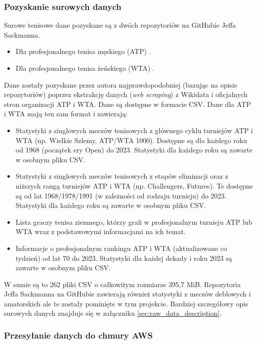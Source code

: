 \documentclass[12pt, a4paper]{article}
\begin{document}
\subsubsection{Pozyskanie surowych danych}
Surowe tenisowe dane pozyskane są z dwóch repozytoriów na GitHubie Jeffa Sackmanna.
\begin{itemize}
    \item Dla profesjonalnego tenisa męskiego (ATP) \cite{tennis_atp}.
    \item Dla profesjonalnego tenisa żeńskiego (WTA) \cite{tennis_wta}.
\end{itemize}
Dane zostały pozyskane przez autora najprawdopodobniej (bazując na opisie repozytoriów) poprzez ekstrakcję danych (\textit{web scraping}) z Wikidata i oficjalnych stron organizacji ATP i WTA. Dane są dostępne w formacie CSV. Dane dla ATP i WTA mają ten sam format i zawierają:
\begin{itemize}
    \item Statystyki z singlowych meczów tenisowych z głównego cyklu turniejów ATP i WTA (np. Wielkie Szlemy, ATP/WTA 1000). Dostępne są dla każdego roku od 1968 (początek ery Open) do 2023. Statystyki dla każdego roku są zawarte w osobnym pliku CSV.
    \item Statystyki z singlowych meczów tenisowych z etapów eliminacji oraz z niższych rangą turniejów ATP i WTA (np. Challengers, Futures). Te dostępne są od lat 1968/1978/1991 (w zależności od rodzaju turnieju) do 2023. Statystyki dla każdego roku są zawarte w osobnym pliku CSV.
    \item Lista graczy tenisa ziemnego, którzy grali w profesjonalnym turnieju ATP lub WTA wraz z podstawowymi informacjami na ich temat.
    \item Informacje o profesjonalnym rankingu ATP i WTA (aktualizowane co tydzień) od lat 70 do 2023. Statystyki dla każdej dekady i roku 2023 są zawarte w osobnym pliku CSV.
\end{itemize}
W sumie są to 262 pliki CSV o całkowitym rozmiarze 395,7 MiB. Repozytoria Jeffa Sackmanna na GitHubie zawierają również statystyki z meczów deblowych i amatorskich ale te zostały pominięte w tym projekcie. Bardziej szczegółowy opis surowych danych znajduje się w załączniku \ref{sec:raw_data_description}.

\subsubsection{Przesyłanie danych do chmury AWS}
\end{document}
